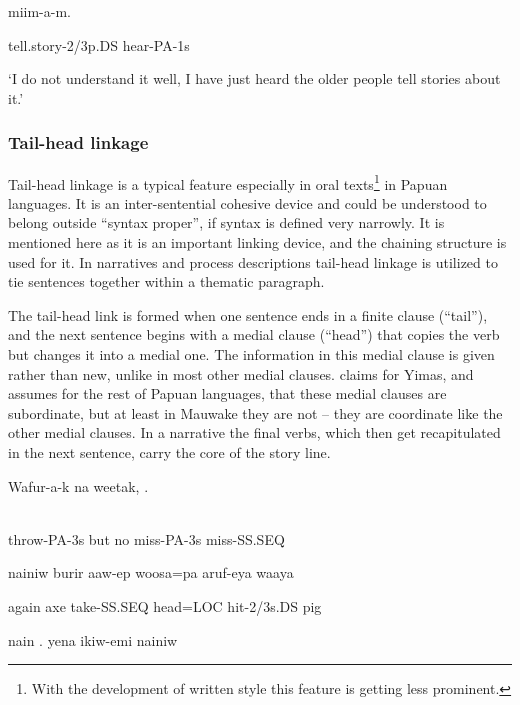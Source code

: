 \textstyleEmphasizedVernacularWords{-}  miim-a-m.

tell.story-2/3p.DS  hear-PA-1s

`I do not understand it well, I have just heard the older people tell stories about it.'

\subsubsection[Tail-head linkage]{Tail-head linkage}
\hypertarget{RefHeading23261935131865}{}
Tail-head linkage is a typical feature especially in oral texts\footnote{With the development of written style this feature is getting less prominent.}  in Papuan languages. It is an inter-sentential cohesive device and could be understood to belong outside ``syntax proper'', if syntax is defined very narrowly. It is mentioned here as it is an important linking device, and the chaining structure is used for it. In narratives and process descriptions tail-head linkage is utilized to tie sentences together within a thematic paragraph. 

 The tail-head link is formed when one sentence ends in a finite clause (``tail''), and the next sentence begins with a medial clause (``head'') that copies the verb but changes it into a medial one. The information in this medial clause is given rather than new, unlike in most other medial clauses. \citet[200-201]{Foley1986} claims for Yimas, and assumes for the rest of Papuan languages, that these medial clauses are subordinate, but at least in Mauwake they are not -- they are coordinate like the other medial clauses. In a narrative the final verbs, which then get recapitulated in the next sentence, carry the core of the story line.

\ea%
\label{ex:x1505}
\gll Wafur-a-k  na  weetak,  .   \\
      \\
\glt
\z

throw-PA-3s  but  no  miss-PA-3s  miss-SS.SEQ

nainiw  burir  aaw-ep  woosa=pa  aruf-eya  waaya

again  axe  take-SS.SEQ  head=LOC  hit-2/3s.DS  pig

nain  .    yena  ikiw-emi  nainiw

